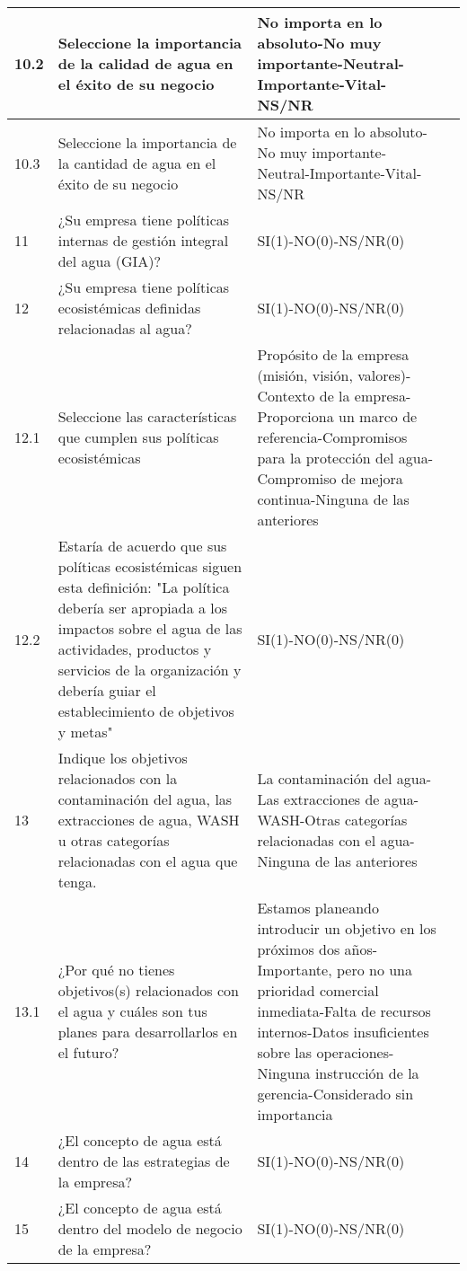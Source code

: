 \begin{longtable}{p{0.75cm}|p{6cm}|p{6cm}|p{2cm}}
\hline
10.2 & Seleccione la importancia de la calidad de agua en el éxito de su negocio & No importa en lo absoluto-No muy importante-Neutral-Importante-Vital-NS/NR & \parencite{disclosure-insight-action-2023} \\
\hline
10.3 & Seleccione la importancia de la cantidad de agua en el éxito de su negocio & No importa en lo absoluto-No muy importante-Neutral-Importante-Vital-NS/NR & \parencite{disclosure-insight-action-2023} \\
\hline
11 & ¿Su empresa tiene políticas internas de gestión integral del agua (GIA)? & SI(1)-NO(0)-NS/NR(0) &  \\
\hline
12 & ¿Su empresa tiene políticas ecosistémicas definidas relacionadas al agua? & SI(1)-NO(0)-NS/NR(0) & \parencite{iso-2004} \\
\hline
12.1 & Seleccione las características que cumplen sus políticas ecosistémicas & Propósito de la empresa (misión, visión, valores)-Contexto de la empresa-Proporciona un marco de referencia-Compromisos para la protección del agua-Compromiso de mejora continua-Ninguna de las anteriores & \parencite{iso-2015} \\
\hline
12.2 & Estaría de acuerdo que sus políticas ecosistémicas siguen esta definición: "La política debería ser apropiada a los impactos sobre el agua de las actividades, productos y servicios de la organización y debería guiar el establecimiento de objetivos y metas" & SI(1)-NO(0)-NS/NR(0) & \parencite{iso-2004} \\
\hline
13 & Indique los objetivos relacionados con la contaminación del agua, las extracciones de agua, WASH u otras categorías relacionadas con el agua que tenga. & La contaminación del agua-Las extracciones de agua-WASH-Otras categorías relacionadas con el agua-Ninguna de las anteriores & \parencite{disclosure-insight-action-2023} \\
\hline
13.1 & ¿Por qué no tienes objetivos(s) relacionados con el agua y cuáles son tus planes para desarrollarlos en el futuro? & Estamos planeando introducir un objetivo en los próximos dos años-Importante, pero no una prioridad comercial inmediata-Falta de recursos internos-Datos insuficientes sobre las operaciones-Ninguna instrucción de la gerencia-Considerado sin importancia & \parencite{disclosure-insight-action-2023} \\
\hline
14 & ¿El concepto de agua está dentro de las estrategias de la empresa? & SI(1)-NO(0)-NS/NR(0) &  \\
\hline
15 & ¿El concepto de agua está dentro del modelo de negocio de la empresa? & SI(1)-NO(0)-NS/NR(0) &  \\

\end{longtable}
